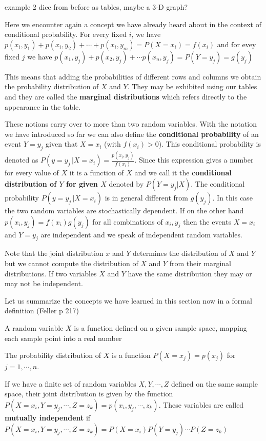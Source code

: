 \documentclass[
]{book}
\providecommand{\tightlist}{%
  \setlength{\itemsep}{0pt}\setlength{\parskip}{0pt}}
\begin{document}
example 2 dice from before as tables, maybe a 3-D graph?

Here we encounter again a concept we have already heard about in the context of conditional
probability. For every fixed \(i\), we have
\(p(x_i, y_1) + p(x_i, y_2) + \cdots + p(x_i, y_m) = P(X = x_i) = f(x_i)\)
and for evey fixed \(j\) we have
\(p(x_1, y_j) + p(x_2, y_j) + \cdots p(x_n, y_j) = P(Y = y_j) = g(y_j)\)

This means that adding the probabilities of different rows and columns we obtain the probability
distribution of \(X\) and \(Y\). They may be exhibited using our tables and they are called the
\textbf{marginal distributions} which refers directly to the appearance in the table.

These notions carry over to more than two random variables. With the notation we have introduced
so far we can also define the \textbf{conditional probability} of an event \(Y = y_j\) given that
\(X = x_i\) (with \(f(x_i) > 0\)). This conditional probability is denoted as
\(P(y = y_j \, | X = x_i) = \frac{p(x_i,y_j)}{f(x_i)}\). Since this expression gives a number for
every value of \(X\) it is a function of \(X\) and
we call it the \textbf{conditional distribution of \(Y\) for given \(X\)} denoted by \(P(Y = y_j | X)\).
The conditional probability \(P(y = y_j \, | X = x_i)\) is in general different from \(g(y_j)\). In
this case the two random variables are stochastically dependent. If on the other hand
\(p(x_i,y_j)=f(x_i)g(y_j)\) for all combinations of \(x_i,y_j\) then the events \(X = x_i\) and \(Y = y_j\)
are independent and we speak of independent random variables.

Note that the joint distribution \(x\) and \(Y\) determines the distribution of \(X\) and \(Y\) but we cannot compute the distribution of \(X\) and \(Y\) from their marginal distributions. If two variables
\(X\) and \(Y\) have the same distribution they may or may not be independent.

Let us summarize the concepts we have learned in this section now in a formal definition (Feller p 217)

\begin{description}
\tightlist
\item[Random variable]
A random variable \(X\) is a function defined on a given sample space, mapping each sample point
into a real number
\item[Probability distribution]
The probability distribution of \(X\) is a function \(P(X = x_j) = p(x_j)\) for \(j = 1, \cdots ,n\).
\item[Joint Distribution]
If we have a finite set of random variables \(X, Y, \cdots, Z\) defined on the same
sample space, their joint distribution is given by the function
\(P(X=x_i, Y = y_j, \cdots, Z=z_k) = p(x_i,y_j, \cdots, z_k)\). These variables are called
\textbf{mutually independent} if
\(P(X=x_i, Y = y_j, \cdots, Z=z_k) = P(X = x_i)P(Y=y_j) \cdots P(Z=z_k)\)
\end{description}
\end{document}

